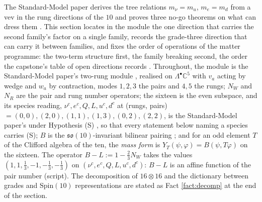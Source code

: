 \documentclass[11pt]{article}
\theoremstyle{definition}
\newcommand{\C}{\mathbb{C}}
\newcommand{\so}{\mathfrak{so}}
\begin{document}
The Standard-Model paper derives the tree relations $m_{\nu} = m_{u}$, $m_{e} = m_{d}$ from a vev in the rung directions of the $10$ and proves three no-go theorems on what can dress them \cite[Cor.~9.25, Thms.~9.31, 9.33, 9.35]{ButlerT12}. This section locates in the module the one direction that carries the second family's factor on a single family, records the grade-three direction that can carry it between families, and fixes the order of operations of the matter programme: the two-term structure first, the family breaking second, the order the capstone's table of open directions records \cite[Table~4]{ButlerT17}. Throughout, the module is the Standard-Model paper's two-rung module \cite[Def.~9.8]{ButlerT12}, realised on $\Lambda^{\bullet}\C^{5}$ with $v_{a}$ acting by wedge and $w_{a}$ by contraction, modes $1, 2, 3$ the pairs and $4, 5$ the rungs; $N_{W}$ and $N_{R}$ are the pair and rung number operators; the sixteen is the even subspace, and its species reading, $\nu^{c}, e^{c}, Q, L, u^{c}, d^{c}$ at (rungs, pairs) $= (0,0), (2,0), (1,1), (1,3), (0,2), (2,2)$, is the Standard-Model paper's under Hypothesis (S) \cite[Prop.~5.8]{ButlerT12}, so that every statement below naming a species carries (S); $B$ is the $\so(10)$-invariant bilinear pairing \cite[Lem.~9.23]{ButlerT12}; and for an odd element $T$ of the Clifford algebra of the ten, the \emph{mass form} is $Y_{T}(\psi, \varphi) = B(\psi, T\varphi)$ on the sixteen. The operator $B - L := 1 - \tfrac23 N_{W}$ takes the values $(1, 1, \tfrac13, -1, -\tfrac13, -\tfrac13)$ on $(\nu^{c}, e^{c}, Q, L, u^{c}, d^{c})$: $B - L$ is an affine function of the pair number (script). The decomposition of $16 \otimes 16$ and the dictionary between grades and $\mathrm{Spin}(10)$ representations are stated as Fact \ref{fact:decomp} at the end of the section.
\end{document}
